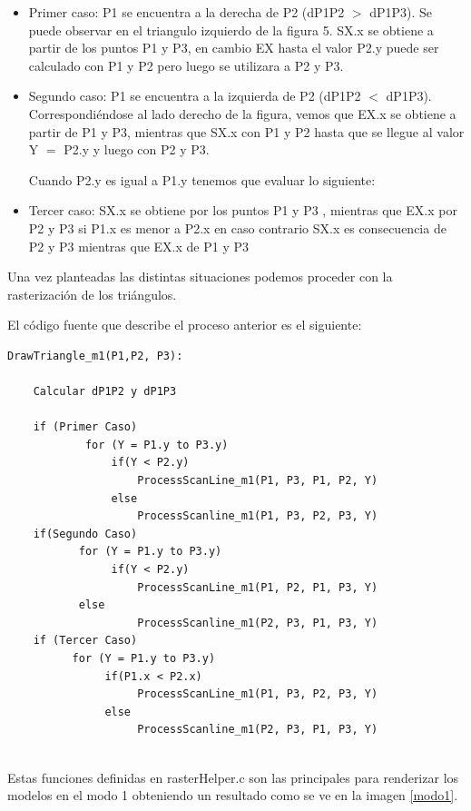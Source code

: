 \documentclass[a4paper]{article}
\begin{document}
\begin{itemize}
\item Primer caso: P1 se encuentra a la derecha de P2 (dP1P2 $>$ dP1P3). Se puede observar en el triangulo izquierdo de la figura 5. SX.x se obtiene a partir de los puntos P1 y P3, en cambio EX hasta el valor P2.y puede ser calculado con P1 y P2 pero luego se utilizara a P2 y P3.
\item Segundo caso: P1 se encuentra a la izquierda de P2 (dP1P2 $<$ dP1P3). Correspondiéndose al lado derecho de la figura, vemos que EX.x se obtiene a partir de P1 y P3, mientras que SX.x con P1 y P2 hasta que se llegue al valor Y $=$ P2.y y luego con P2 y P3. 
\par Cuando P2.y es igual a P1.y tenemos que evaluar lo siguiente:
\item Tercer caso:  SX.x se obtiene por los puntos P1 y P3 , mientras que EX.x por P2 y P3 si P1.x es menor a P2.x en caso contrario SX.x es consecuencia de P2 y P3 mientras que EX.x de P1 y P3 
\end{itemize}
Una vez planteadas las distintas situaciones podemos proceder con la rasterización de los triángulos. 
  
El código fuente que describe el proceso anterior es el siguiente:
\begin{verbatim}
DrawTriangle_m1(P1,P2, P3):
    
    Calcular dP1P2 y dP1P3
    
    if (Primer Caso)
            for (Y = P1.y to P3.y)      
                if(Y < P2.y)
                    ProcessScanLine_m1(P1, P3, P1, P2, Y)
                else
                    ProcessScanline_m1(P1, P3, P2, P3, Y)
    if(Segundo Caso)
           for (Y = P1.y to P3.y)       
                if(Y < P2.y)
                    ProcessScanLine_m1(P1, P2, P1, P3, Y)
           else
                    ProcessScanline_m1(P2, P3, P1, P3, Y)
    if (Tercer Caso)    
          for (Y = P1.y to P3.y)        
               if(P1.x < P2.x)
                    ProcessScanLine_m1(P1, P3, P2, P3, Y)
               else
                    ProcessScanline_m1(P2, P3, P1, P3, Y)
                                        
\end{verbatim}

Estas funciones definidas en rasterHelper.c son las principales para renderizar los modelos en el modo 1 obteniendo un resultado como se ve en la imagen \ref{modo1}.
\end{document}
